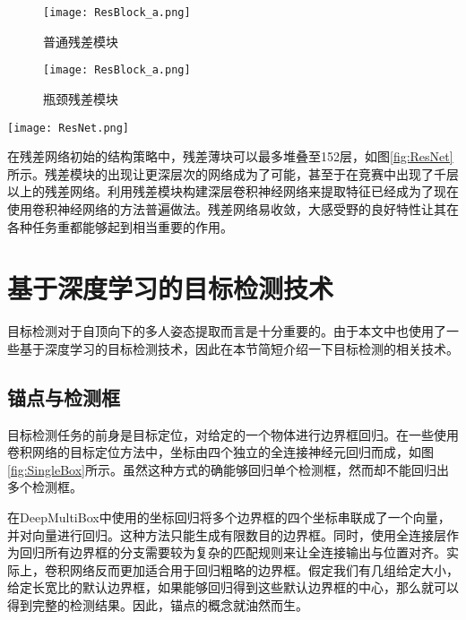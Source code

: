 \begin{figure*}[htbp]	
	\centering
	\begin{subfigure}[b]{0.35\textwidth}
		\texttt{[image: ResBlock\_a.png]}
		\caption{普通残差模块}
	\end{subfigure}
	\hskip1.5cm
	\begin{subfigure}[b]{0.35\textwidth}
		\texttt{[image: ResBlock\_a.png]}
		\caption{瓶颈残差模块}
	\end{subfigure}
	\caption{残差模块结构\cite{He2015Deep}}
	\label{fig:Resblock}
\end{figure*}
\begin{figure*}[htbp]	
	\centering
	\texttt{[image: ResNet.png]}
	\caption{残差网络结构\cite{He2015Deep}}
	\label{fig:ResNet}
\end{figure*}

在残差网络初始的结构策略中，残差薄块可以最多堆叠至152层，如图\ref{fig:ResNet}所示。残差模块的出现让更深层次的网络成为了可能，甚至于在竞赛中出现了千层以上的残差网络。利用残差模块构建深层卷积神经网络来提取特征已经成为了现在使用卷积神经网络的方法普遍做法。残差网络易收敛，大感受野的良好特性让其在各种任务重都能够起到相当重要的作用。

\section{基于深度学习的目标检测技术}
\label{sec:factsobjectdetection}
目标检测对于自顶向下的多人姿态提取而言是十分重要的。由于本文中也使用了一些基于深度学习的目标检测技术，因此在本节简短介绍一下目标检测的相关技术。

\subsection{锚点与检测框}
\label{subsec:factsanchors}
目标检测任务的前身是目标定位，对给定的一个物体进行边界框回归\cite{ILSVRC15}。在一些使用卷积网络的目标定位方法中，坐标由四个独立的全连接神经元回归而成，如图\ref{fig:SingleBox}所示。虽然这种方式的确能够回归单个检测框，然而却不能回归出多个检测框。

在DeepMultiBox中使用的坐标回归\cite{erhan2014scalable}将多个边界框的四个坐标串联成了一个向量，并对向量进行回归。这种方法只能生成有限数目的边界框。同时，使用全连接层作为回归所有边界框的分支需要较为复杂的匹配规则来让全连接输出与位置对齐。实际上，卷积网络反而更加适合用于回归粗略的边界框。假定我们有几组给定大小，给定长宽比的默认边界框，如果能够回归得到这些默认边界框的中心，那么就可以得到完整的检测结果。因此，锚点的概念就油然而生。

